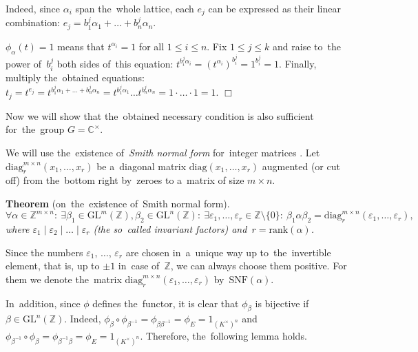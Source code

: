 \documentclass[twoside]{article}
\begin{document}
    Indeed, since $\alpha_i$ span the~whole lattice, each $e_j$ can be expressed as their linear combination:
    $
        e_j = b^j_1 \alpha_1 + \ldots + b^j_n \alpha_n.
    $

    $\phi_\alpha(t) = 1$ means that $t^{\alpha_i} = 1$ for all $1 \leq i \leq n$.
    Fix $1 \leq j \leq k$ and raise to~the power of~$b^j_i$ both sides of~this equation:
    $t^{b^j_i \alpha_i} = (t^{\alpha_i})^{b^j_i} = 1^{b^j_i} = 1$.
    Finally, multiply the~obtained equations:
    $
        t_j = t^{e_j} = t^{b^j_1 \alpha_1 + \ldots + b^j_n \alpha_n} = t^{b^j_1 \alpha_1} \ldots t^{b^j_n \alpha_n} = 1 \cdot \ldots \cdot 1 = 1.
    $
\hfill$\Box$\medskip

Now we will show that the~obtained necessary condition is also sufficient for~the~group $G = {\mathbb{C}^\times}$.

We will use the~existence of~\textit{Smith normal form} for~integer matrices \cite{Smth60}.
Let $\mathrm{diag}^{m \times n}_r(x_1,\allowbreak \ldots,\allowbreak x_r)$ be a~diagonal matrix $\mathrm{diag}(x_1,\allowbreak \ldots,\allowbreak x_r)$
augmented (or cut off) from the~bottom right by~zeroes to a~matrix of size $m \times n$.

\medskip\noindent\textbf{Theorem} (on~the~existence of~Smith normal form).\emph{
    $$
        \forall \alpha \in \mathbb{Z}^{m \times n}{:}\
        \exists \beta_1 \in \mathrm{GL}^m(\mathbb{Z}), \beta_2 \in \mathrm{GL}^n(\mathbb{Z}){:} \
        \exists \varepsilon_1, \ldots, \varepsilon_r \in \mathbb{Z} \setminus \{0\}{:} \
        \beta_1 \alpha \beta_2 = \mathrm{diag}^{m \times n}_r(\varepsilon_1, \ldots, \varepsilon_r),
    $$
    where $\varepsilon_1 \mid \varepsilon_2 \mid \ldots \mid \varepsilon_r$ (the so~called invariant factors) and~$r = \mathrm{rank}(\alpha)$.
}\medskip

Since the numbers $\varepsilon_1$, $\ldots$, $\varepsilon_r$ are chosen in~a~unique way up to~the~invertible element,
that is, up to $\pm 1$ in~case of~$\mathbb{Z}$, we can always choose them positive. For them we denote
the~matrix $\mathrm{diag}^{m \times n}_r(\varepsilon_1, \ldots, \varepsilon_r)$ by~$\mathrm{SNF}(\alpha)$.

In~addition, since $\phi$ defines the~functor, it is clear that $\phi_\beta$ is bijective if $\beta \in \mathrm{GL}^n(\mathbb{Z})$.
Indeed, $\phi_\beta \circ \phi_{\beta^{-1}} = \phi_{\beta \beta^{-1}} = \phi_E = 1_{(K^\times)^n}$
and~$\phi_{\beta^{-1}} \circ \phi_\beta = \phi_{\beta^{-1} \beta} = \phi_E = 1_{(K^\times)^n}$. Therefore,
the~following lemma holds.
\end{document}
